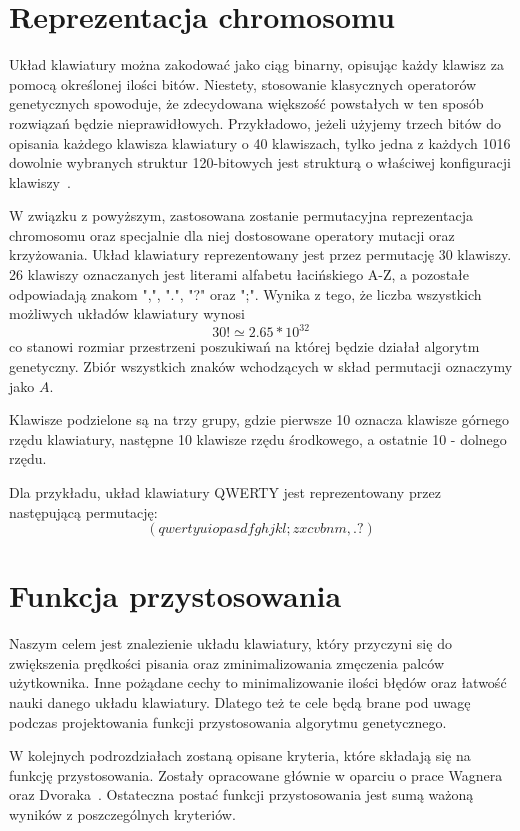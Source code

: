 \documentclass{xmgr}
\begin{document}
\section{Reprezentacja chromosomu}

Układ klawiatury można zakodować jako ciąg binarny, opisując każdy klawisz za pomocą określonej ilości bitów. Niestety, stosowanie klasycznych operatorów genetycznych spowoduje, że zdecydowana większość powstałych w ten sposób rozwiązań będzie nieprawidłowych. Przykładowo, jeżeli użyjemy trzech bitów do opisania każdego klawisza klawiatury o 40 klawiszach, tylko jedna z każdych 1016 dowolnie wybranych struktur 120-bitowych jest strukturą o właściwej konfiguracji klawiszy~\cite{GloverKey}.

W związku z powyższym, zastosowana zostanie permutacyjna reprezentacja chromosomu oraz specjalnie dla niej dostosowane operatory mutacji oraz krzyżowania. Układ klawiatury reprezentowany jest przez permutację 30 klawiszy. 26 klawiszy oznaczanych jest literami alfabetu łacińskiego A-Z, a pozostałe odpowiadają znakom ",", ".", "?" oraz ";". Wynika z tego, że liczba wszystkich możliwych układów klawiatury wynosi $$ 30! \simeq 2.65 * 10^{32} $$ co stanowi rozmiar przestrzeni poszukiwań na której będzie działał algorytm genetyczny. Zbiór wszystkich znaków wchodzących w skład permutacji oznaczymy jako $ A $.

Klawisze podzielone są na trzy grupy, gdzie pierwsze 10 oznacza klawisze górnego rzędu klawiatury, następne 10 klawisze rzędu środkowego, a ostatnie 10 - dolnego rzędu.

Dla przykładu, układ klawiatury QWERTY jest reprezentowany przez następującą permutację:
$$ (qwertyuiopasdfghjkl;zxcvbnm,.?) $$


\section{Funkcja przystosowania}

Naszym celem jest znalezienie układu klawiatury, który przyczyni się do zwiększenia prędkości pisania oraz zminimalizowania zmęczenia palców użytkownika. Inne pożądane cechy to minimalizowanie ilości błędów oraz łatwość nauki danego układu klawiatury. Dlatego też te cele będą brane pod uwagę podczas projektowania funkcji przystosowania algorytmu genetycznego.

W kolejnych podrozdziałach zostaną opisane kryteria, które składają się na funkcję przystosowania. Zostały opracowane głównie w oparciu o prace Wagnera~\cite{Eggers2003672} oraz Dvoraka~\cite{cassingham1986dvorak}. Ostateczna postać funkcji przystosowania jest sumą ważoną wyników z poszczególnych kryteriów.
\end{document}
